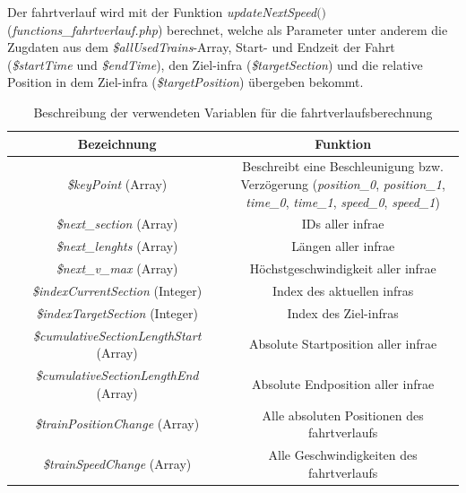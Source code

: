 Der \Gls{fahrtverlauf} wird mit der Funktion \textit{updateNextSpeed$($$)$} (\textit{functions\_fahrt\-ver\-lauf.php}) berechnet, welche als Parameter unter anderem die Zugdaten aus dem \textit{\$all\-Used\-Trains}-Array, Start- und Endzeit der Fahrt (\textit{\$startTime} und \textit{\$endTime}), den Ziel-\ac{infra} (\textit{\$targetSection}) und die relative Position in dem Ziel-\ac{infra} (\textit{\$targetPosition}) übergeben bekommt.
\begin{table}
\begin{center}
\renewcommand{\arraystretch}{1.2}
\begin{tabular}{c|c}
Bezeichnung & Funktion \\ \hline
\textit{\$keyPoint} (Array)                   			&   \makecell{Beschreibt eine Beschleunigung bzw.\\Verzögerung (\textit{position\_0}, \textit{position\_1},\\ \textit{time\_0}, \textit{time\_1}, \textit{speed\_0}, \textit{speed\_1})}           \\ \hline
\textit{\$next\_section} (Array)                  		&    IDs aller \ac{infra}e                  \\ \hline
\textit{\$next\_lenghts} (Array)                  		&    Längen aller \ac{infra}e                  \\ \hline
\textit{\$next\_v\_max} (Array)                  		&    Höchstgeschwindigkeit aller \ac{infra}e                  \\ \hline
\textit{\$indexCurrentSection} (Integer)             	&    Index des aktuellen \ac{infra}s               \\ \hline
\textit{\$indexTargetSection} (Integer)               	&    Index des Ziel-\ac{infra}s                  \\ \hline
\makecell{\textit{\$cumulativeSectionLengthStart}\\(Array) }	&    Absolute Startposition aller \ac{infra}e                  \\ \hline
\makecell{\textit{\$cumulativeSectionLengthEnd}\\(Array)  }	&    Absolute Endposition aller \ac{infra}e                  \\ \hline
\textit{\$trainPositionChange} (Array)                	&    Alle absoluten Positionen des \Gls{fahrtverlauf}s                  \\ \hline
\textit{\$trainSpeedChange} (Array)                  	&   Alle Geschwindigkeiten des \Gls{fahrtverlauf}s                  \\
\end{tabular}
\renewcommand{\arraystretch}{1}
\caption{Beschreibung der verwendeten Variablen für die \Gls{fahrtverlauf}sberechnung}
\label{table:vars}
\end{center}
\end{table}

